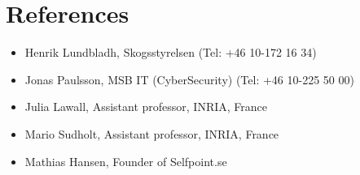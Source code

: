 \documentclass[11pt,a4paper,sans]{moderncv}
\begin{document}
\section{References}
\begin{cvcolumns}
      {\begin{itemize}
      \item Henrik Lundbladh, Skogsstyrelsen (Tel: +46 10-172 16 34)
      \item Jonas Paulsson, MSB IT (CyberSecurity) (Tel: +46 10-225 50 00)
      \item Julia Lawall, Assistant professor, INRIA, France
      \item Mario Sudholt,  Assistant professor, INRIA, France
      \item Mathias Hansen, Founder of Selfpoint.se 
      \end{itemize}}
\end{cvcolumns}
\footnotesize


\nocite{*}


\clearpage
\Large
\end{document}
